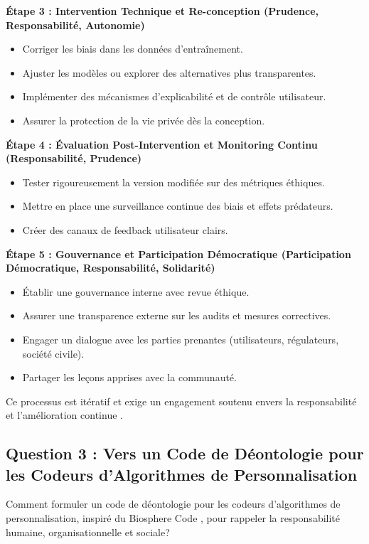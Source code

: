 \documentclass[11pt,a4paper]{article}
\begin{document}
\textbf{Étape 3 : Intervention Technique et Re-conception (Prudence, Responsabilité, Autonomie)}
\begin{itemize}
    \item Corriger les biais dans les données d'entraînement.
    \item Ajuster les modèles ou explorer des alternatives plus transparentes.
    \item Implémenter des mécanismes d'explicabilité et de contrôle utilisateur.
    \item Assurer la protection de la vie privée dès la conception.
\end{itemize}

\textbf{Étape 4 : Évaluation Post-Intervention et Monitoring Continu (Responsabilité, Prudence)}
\begin{itemize}
    \item Tester rigoureusement la version modifiée sur des métriques éthiques.
    \item Mettre en place une surveillance continue des biais et effets prédateurs.
    \item Créer des canaux de feedback utilisateur clairs.
\end{itemize}

\textbf{Étape 5 : Gouvernance et Participation Démocratique (Participation Démocratique, Responsabilité, Solidarité)}
\begin{itemize}
    \item Établir une gouvernance interne avec revue éthique.
    \item Assurer une transparence externe sur les audits et mesures correctives.
    \item Engager un dialogue avec les parties prenantes (utilisateurs, régulateurs, société civile).
    \item Partager les leçons apprises avec la communauté.
\end{itemize}
Ce processus est itératif et exige un engagement soutenu envers la responsabilité et l'amélioration continue \cite{DeclarationMontreal2018}.

\subsection{Question 3 : Vers un Code de Déontologie pour les Codeurs d'Algorithmes de Personnalisation}
Comment formuler un code de déontologie pour les codeurs d'algorithmes de personnalisation, inspiré du Biosphere Code \cite{BiosphereCode2015}, pour rappeler la responsabilité humaine, organisationnelle et sociale?
\end{document}
